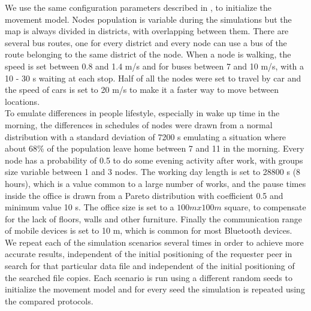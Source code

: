 We use the same configuration parameters described in \cite{articoloWdm}, to initialize the movement model. Nodes population is variable during the simulations but the map is always divided in districts, with overlapping between them. There are several bus routes, one for every district and every node can use a bus of the route belonging to the same district of the node. When a node is walking, the speed is set between 0.8 and 1.4 m/s and for buses between 7 and 10 m/s, with a 10 - 30 s waiting at each stop. Half of all the nodes were set to travel by car and the speed of cars is set to 20 m/s to make it a faster way to move between locations. 
\\

To emulate differences in people lifestyle, especially in wake up time in the morning, the differences in schedules of nodes were drawn from a normal distribution with a standard deviation of 7200 s emulating a situation where about 68\% of the population leave home between 7 and 11 in the morning. Every node has a probability of 0.5 to do some evening activity after work, with groups size variable between 1 and 3 nodes. The working day length is set to 28800 s (8 hours), which is a value common to a large number of works, and the pause times inside the office is drawn from a Pareto distribution with coefficient 0.5 and minimum value 10 s. The office size is set to a $100 m x 100 m$ square, to compensate for the lack of floors, walls and other furniture. Finally the communication range of mobile devices is set to 10 m, which is common for most Bluetooth devices.
\\

We repeat each of the simulation scenarios several times in order to achieve more accurate results, independent of the initial positioning of the requester peer in search for that particular data file and independent of the initial positioning of the searched file copies. Each scenario is run using a different random seeds to initialize the movement model and for every seed the simulation is repeated using the compared protocols.

\newpage

